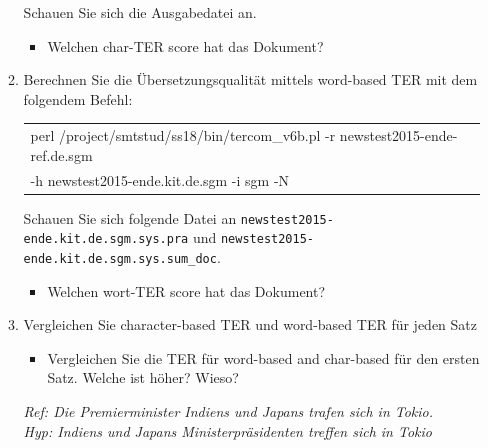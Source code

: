 \documentclass[12pt,fleqn]{article}
\begin{document}
\begin{enumerate}
\begin{enumerate}
\vspace{0.5cm} 
Schauen Sie sich die Ausgabedatei an. 

\vspace{0.5cm} 
\begin{itemize} 
\item Welchen char-TER score hat das Dokument? %
\end{itemize} 


\vspace{0.5cm} 
\item Berechnen Sie die Übersetzungsqualität mittels word-based TER mit dem folgendem Befehl:

\vspace{0.5cm} 
\begin{table}[h] 
 \begin{center} 
\begin{tabular}{l} 
perl /project/smtstud/ss18/bin/tercom\_v6b.pl -r newstest2015-ende-ref.de.sgm\\
-h newstest2015-ende.kit.de.sgm -i sgm -N \\ 
\end{tabular}
 \end{center}
\end{table}

\vspace{0.5cm}
Schauen Sie sich folgende Datei an \texttt{newstest2015-ende.kit.de.sgm.sys.pra} und \texttt{newstest2015-ende.kit.de.sgm.sys.sum\_doc}. 
\vspace{0.5cm} 
\begin{itemize} 
\item Welchen wort-TER score hat das Dokument? %
\end{itemize} 

\vspace{0.5cm} 
\item Vergleichen Sie character-based TER und word-based TER für jeden Satz

\vspace{0.5cm} 
\begin{itemize} 
 \item Vergleichen Sie die TER für word-based and char-based für den ersten Satz. Welche ist höher? Wieso? 
\end{itemize}

\vspace{0.5cm} 
\textit{Ref: Die Premierminister Indiens und Japans trafen sich in Tokio. } \\ 
\textit{Hyp: Indiens und Japans Ministerpräsidenten treffen sich in Tokio } \\ 



\end{enumerate}
\end{enumerate}
\end{document}
